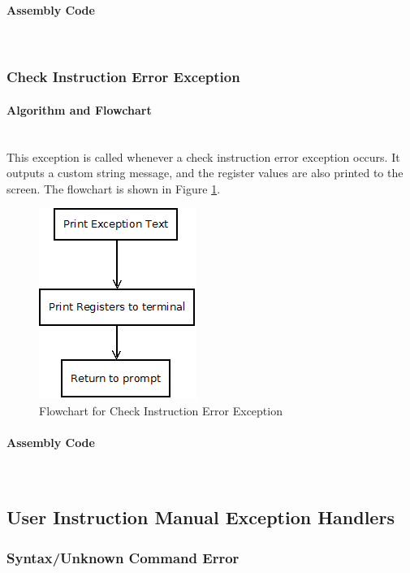 \documentclass[12pt]{article}
\begin{document}
			\paragraph{Assembly Code}~\\		
			
			\subsubsection{Check Instruction Error Exception}
			\paragraph{Algorithm and Flowchart}~\\
			This exception is called whenever a check instruction error exception occurs. It outputs a custom string message, and the register values are also printed to the screen. The flowchart is shown in Figure \ref{fig:chk}.
			
			\begin{figure}[H]
				\centering
				\includegraphics[width=0.3\linewidth]{Exception}
				\caption{Flowchart for Check Instruction Error Exception}
				\label{fig:chk}
			\end{figure}
			\paragraph{Assembly Code}~\\			
			
			\subsection{User Instruction Manual Exception Handlers}
			
			\subsubsection{Syntax/Unknown Command Error}
\end{document}
